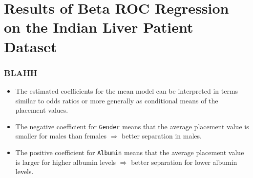 \documentclass[t]{beamer}
\begin{document}
\section{Results of Beta ROC Regression on the Indian Liver Patient Dataset}

\begin{frame}
	\frametitle{BLAHH}
	\begin{center}
	\begin{threeparttable}
	\end{threeparttable}
\end{center}
\begin{small}
	\begin{itemize}
		\item The estimated coefficients for the mean model can be interpreted in terms similar to odds ratios or more generally as conditional means of the placement values.
		\item The negative coefficient for \texttt{Gender} means that the average placement value is smaller for males than females $\Rightarrow$ better separation in males.
		\item The positive coefficient for \texttt{Albumin} means that the average placement value is larger for higher albumin levels $\Rightarrow$ better separation for lower albumin levels.
	\end{itemize}
\end{small}
\end{frame}
\end{document}
